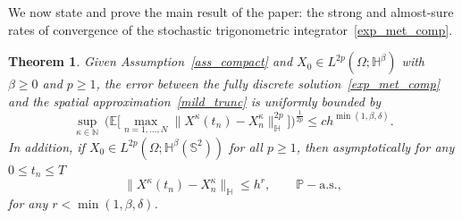 \documentclass[a4paper]{amsart}
\newtheorem{thm}{Theorem}
\theoremstyle{remark}
\theoremstyle{definition}
\newcommand{\N}{\mathbb{N}}
\newcommand{\HH}{\mathbb{H}}
\begin{document}
We now state and prove the main result of the paper: the strong and almost-sure rates of convergence of the stochastic trigonometric integrator~\eqref{exp_met_comp}.
\begin{thm}
\label{tem_thm}
Given Assumption~\ref{ass_compact} and $X_0\in L^{2p}(\Omega; \HH^\beta)$ with $\beta \ge 0$ and $p\ge 1$, the error between the fully discrete solution~\eqref{exp_met_comp} and the spatial approximation~\eqref{mild_trunc} is uniformly bounded by
$$
\sup_{\kappa \in \N}\ \bigg(\mathbb{E}\bigg[\max_{n=1,\dots,N} \big\|X^\kappa(t_n)-X^\kappa_n\big\|^{2p}_{\HH}\bigg]\bigg)^{\frac{1}{2p}}
\le c h^{\min\left(1,\beta,\delta\right)}.
$$
In addition, if $X_0\in L^{2p}(\Omega; {\HH}^\beta(\mathbb{S}^2))$ for all $p\geq 1$, then asymptotically for any $0\leq t_n\leq T$
\begin{equation*}
\big\|X^\kappa(t_n)-X^\kappa_n \big\|_{\HH} \le h^{r},  \qquad \mathbb{P}-\text{a.s.},
\end{equation*}
for any $r< \min(1,\beta,\delta)$.
\end{thm}
\end{document}
